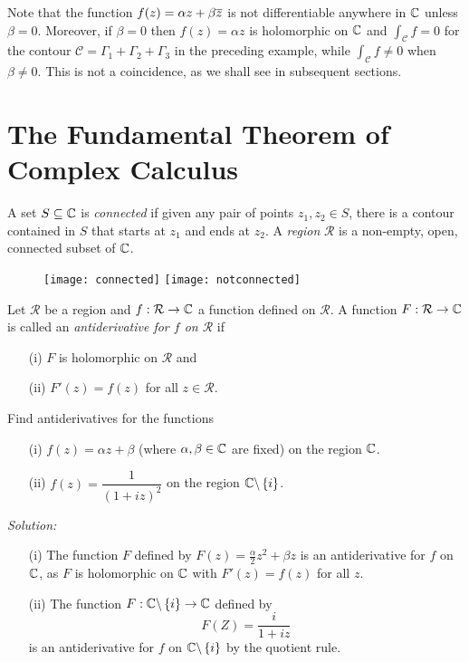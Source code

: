 Note that the function $f(z) =\alpha z + \beta \overline{z}$ is not differentiable anywhere in $\mathbb{C}$ unless $\beta = 0$.  Moreover, if $\beta = 0$ then $f(z)=\alpha z$ is holomorphic on $\mathbb{C}$ and $\int_{\mathcal{C}} f = 0$ for the contour $\mathcal{C}=\Gamma_1+\Gamma_2+\Gamma_3$ in the preceding example, while $\int_{\mathcal{C}} f \neq 0$ when $\beta \neq 0$.  This is not a coincidence, as we shall see in subsequent sections.\section{The Fundamental Theorem of Complex Calculus}
\begin{definition}
A set $S \subseteq \mathbb{C}$ is \emph{connected} if given any pair of points $z_1,z_2 \in S$, there is a contour contained in $S$ that starts at $z_1$ and ends at $z_2$. A \emph{region} $\mathcal{R}$ is a non-empty, open, connected subset of $\mathbb{C}$.
\end{definition}
\begin{figure}[h]
\centering
\texttt{[image: connected]} \qquad \texttt{[image: notconnected]}
\end{figure}
\begin{definition}
Let $\mathcal{R}$ be a region and $f:\mathcal{R} \to \mathbb{C}$ a function defined on $\mathcal{R}$.  A function $F:\mathcal{R} \to \mathbb{C}$ is called an \emph{antiderivative for $f$ on $\mathcal{R}$} if
\begin{enumerate}
\item[(i)] $F$ is holomorphic on $\mathcal{R}$ and
\item[(ii)] $F'(z)=f(z)$ for all $z \in \mathcal{R}$.
\end{enumerate}
\end{definition}
\begin{example}
Find antiderivatives for the functions
\begin{enumerate}
\item[(i)] $f(z)=\alpha z + \beta$ (where $\alpha, \beta \in \mathbb{C}$ are fixed) on the region $\mathbb{C}$.
\item[(ii)] $f(z) = \dfrac{1}{(1+iz)^2}$ on the region $\mathbb{C} \backslash \left\{i\right\}$. 
\end{enumerate}
\textit{Solution:}
\begin{enumerate}
\item[(i)] The function $F$ defined by $F(z) = \frac{\alpha}{2} z^2+\beta z$ is an antiderivative for $f$ on $\mathbb{C}$, as $F$ is holomorphic on $\mathbb{C}$ with $F'(z)=f(z)$ for all $z$.
\item[(ii)] The function $F:\mathbb{C} \backslash \left\{i\right\} \to \mathbb{C}$ defined by
\[
F(Z)=\frac{i}{1+iz}
\]
is an antiderivative for $f$ on $\mathbb{C} \backslash \left\{i\right\}$ by the quotient rule.
\end{enumerate}
\end{example}
